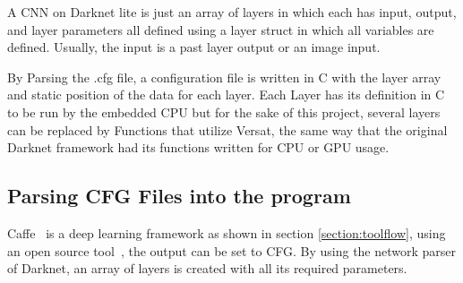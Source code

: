 \documentclass[conference]{IEEEtran}
\begin{document}
A CNN on Darknet lite is just an array of layers in which each has input, 
output, and layer parameters all defined using a layer struct in which all variables are defined.
Usually, the input is a past layer output or an image input.

% 

By Parsing the .cfg file, a configuration file is written in C with the layer array and static position of the data for each layer. 
Each Layer has its definition in C to be run by the embedded CPU but for the sake of this project, several layers can be
replaced by Functions that utilize Versat, the same way that the original Darknet framework had its functions written for CPU or GPU usage.


% 



\subsection{Parsing CFG Files into the program}

Caffe~\cite{caffe} is a deep learning framework as shown in section \ref{section:toolflow},
using an open source tool~\cite{caffe2darknet}, the output can be set to CFG.
By using the network parser of Darknet, an array of layers is created with all
its required parameters. 

% 


% 
\end{document}
